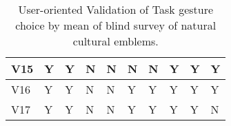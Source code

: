 \begin{table}[ht]
\begin{tabular}{|l|l|l|l|l|l|l|l|l|l|}
    V15                      & \cellcolor[HTML]{D6FDD5}Y & \cellcolor[HTML]{D6FDD5}Y & \cellcolor[HTML]{FFE7E6}N & \cellcolor[HTML]{FFE7E6}N & \cellcolor[HTML]{FFE7E6}N & \cellcolor[HTML]{FFE7E6}N & \cellcolor[HTML]{D6FDD5}Y & \cellcolor[HTML]{D6FDD5}Y & \cellcolor[HTML]{D6FDD5}Y \\ \hline
    V16                      & \cellcolor[HTML]{D6FDD5}Y & \cellcolor[HTML]{D6FDD5}Y & \cellcolor[HTML]{FFE7E6}N & \cellcolor[HTML]{FFE7E6}N & \cellcolor[HTML]{D6FDD5}Y & \cellcolor[HTML]{D6FDD5}Y & \cellcolor[HTML]{D6FDD5}Y & \cellcolor[HTML]{D6FDD5}Y & \cellcolor[HTML]{D6FDD5}Y \\ \hline
    V17                      & \cellcolor[HTML]{D6FDD5}Y & \cellcolor[HTML]{D6FDD5}Y & \cellcolor[HTML]{FFE7E6}N & \cellcolor[HTML]{FFE7E6}N & \cellcolor[HTML]{D6FDD5}Y & \cellcolor[HTML]{D6FDD5}Y & \cellcolor[HTML]{D6FDD5}Y & \cellcolor[HTML]{D6FDD5}Y & \cellcolor[HTML]{FFE7E6}N \\ \hline
    \end{tabular}
    \caption{\label{tab:Table_GestureValidationPretest}User-oriented Validation of Task gesture choice by mean of blind survey of natural cultural emblems.}
    \end{table}
    
